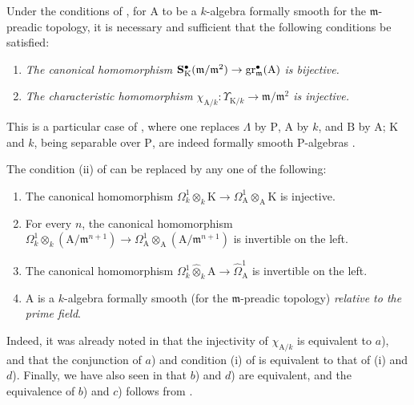 \begin{theorem}[22.2.2]
\label{0.22.2.2}
Under the conditions of , for $\mathrm{A}$ to be a $k$-algebra formally smooth for the $\mathfrak{m}$-preadic topology, it is necessary and sufficient that the following conditions be satisfied:
\begin{enumerate}
  \item[\rm{(i)}] \emph{The canonical homomorphism $\mathbf{S}^\bullet_\mathrm{K}(\mathfrak{m}/\mathfrak{m}^2)\to\operatorname{gr}^\bullet_\mathfrak{m}(\mathrm{A})$ is bijective.}
  \item[\rm{(ii)}] \emph{The characteristic homomorphism $\chi_{\mathrm{A}/k}:\Upsilon_{\mathrm{K}/k}\to\mathfrak{m}/\mathfrak{m}^2$ is injective.}
\end{enumerate}
This is a particular case of , where one replaces $\Lambda$ by $\mathrm{P}$, $\mathrm{A}$ by $k$, and $\mathrm{B}$ by $\mathrm{A}$; $\mathrm{K}$ and $k$, being separable over $\mathrm{P}$, are indeed formally smooth $\mathrm{P}$-algebras .
\end{theorem}

\begin{remark}[22.2.3]
\label{0.22.2.3}
The condition (ii) of  can be replaced by any one of the following:
\begin{enumerate}
  \item[\textit{a)}] The canonical homomorphism $\Omega^1_k\otimes_k\mathrm{K}\to\Omega^1_\mathrm{A}\otimes_\mathrm{A}\mathrm{K}$ is injective.
  \item[\textit{b)}] For every $n$, the canonical homomorphism $\Omega^1_k\otimes_k(\mathrm{A}/\mathfrak{m}^{n+1})\to\Omega^1_\mathrm{A}\otimes_\mathrm{A}(\mathrm{A}/\mathfrak{m}^{n+1})$ is invertible on the left.
  \item[\textit{c)}] The canonical homomorphism $\Omega^1_k\widehat{\otimes}_k\mathrm{A}\to\widehat{\Omega}^1_\mathrm{A}$ is invertible on the left.
  \item[\textit{d)}] $\mathrm{A}$ is a $k$-algebra formally smooth (for the $\mathfrak{m}$-preadic topology) \emph{relative to the prime field}.
\end{enumerate}
Indeed, it was already noted in  that the injectivity of $\chi_{\mathrm{A}/k}$ is equivalent to $a$), and that the conjunction of $a$) and condition (i) of  is equivalent to that of (i) and $d$).
Finally, we have also seen in  that $b$) and $d$) are equivalent, and the equivalence of $b$) and $c$) follows from .
\end{remark}

